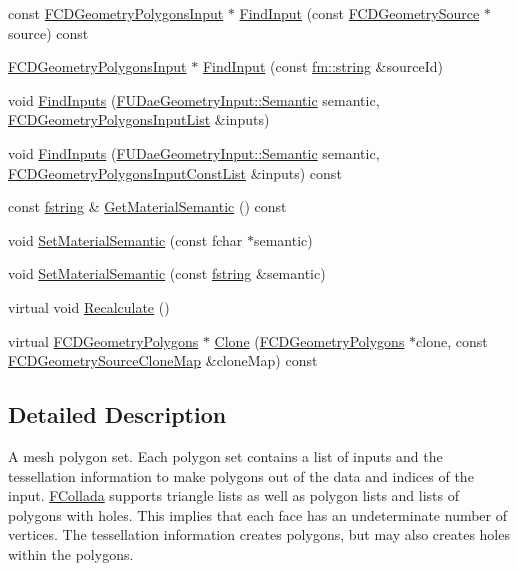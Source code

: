 \begin{DoxyCompactItemize}
\item 
const \hyperlink{classFCDGeometryPolygonsInput}{FCDGeometryPolygonsInput} $\ast$ \hyperlink{classFCDGeometryPolygons_a336f2538f73dcc9650f4829398fe440e}{FindInput} (const \hyperlink{classFCDGeometrySource}{FCDGeometrySource} $\ast$source) const 
\item 
\hyperlink{classFCDGeometryPolygonsInput}{FCDGeometryPolygonsInput} $\ast$ \hyperlink{classFCDGeometryPolygons_a4db38610be5d3715269773c7c161fd54}{FindInput} (const \hyperlink{classfm_1_1stringT}{fm::string} \&sourceId)
\item 
void \hyperlink{classFCDGeometryPolygons_a5a10d70c6f4de95aeb1e2cc99971bfa4}{FindInputs} (\hyperlink{namespaceFUDaeGeometryInput_a0f887d29f54b10338ebcf73789a7a061}{FUDaeGeometryInput::Semantic} semantic, \hyperlink{classfm_1_1pvector}{FCDGeometryPolygonsInputList} \&inputs)
\item 
void \hyperlink{classFCDGeometryPolygons_aecb6402d3e1d9f8e34e2b6372cddd017}{FindInputs} (\hyperlink{namespaceFUDaeGeometryInput_a0f887d29f54b10338ebcf73789a7a061}{FUDaeGeometryInput::Semantic} semantic, \hyperlink{classfm_1_1pvector}{FCDGeometryPolygonsInputConstList} \&inputs) const 
\item 
const \hyperlink{classfm_1_1stringT}{fstring} \& \hyperlink{classFCDGeometryPolygons_a12d1469fd0d4cc0a0275c6290ed50afa}{GetMaterialSemantic} () const 
\item 
void \hyperlink{classFCDGeometryPolygons_a72dfb0d4aa1cbbb5c488483b53eee1d2}{SetMaterialSemantic} (const fchar $\ast$semantic)
\item 
void \hyperlink{classFCDGeometryPolygons_aa311b07a2317dd9414f06a262cfab631}{SetMaterialSemantic} (const \hyperlink{classfm_1_1stringT}{fstring} \&semantic)
\item 
virtual void \hyperlink{classFCDGeometryPolygons_aaa536fd31b6ec7c5b581cba2c155beb6}{Recalculate} ()
\item 
virtual \hyperlink{classFCDGeometryPolygons}{FCDGeometryPolygons} $\ast$ \hyperlink{classFCDGeometryPolygons_a517383d9be9015cfebe96fab6f5502e0}{Clone} (\hyperlink{classFCDGeometryPolygons}{FCDGeometryPolygons} $\ast$clone, const \hyperlink{classfm_1_1map}{FCDGeometrySourceCloneMap} \&cloneMap) const 
\end{DoxyCompactItemize}


\subsection{Detailed Description}
A mesh polygon set. Each polygon set contains a list of inputs and the tessellation information to make polygons out of the data and indices of the input. \hyperlink{namespaceFCollada}{FCollada} supports triangle lists as well as polygon lists and lists of polygons with holes. This implies that each face has an undeterminate number of vertices. The tessellation information creates polygons, but may also creates holes within the polygons. 

